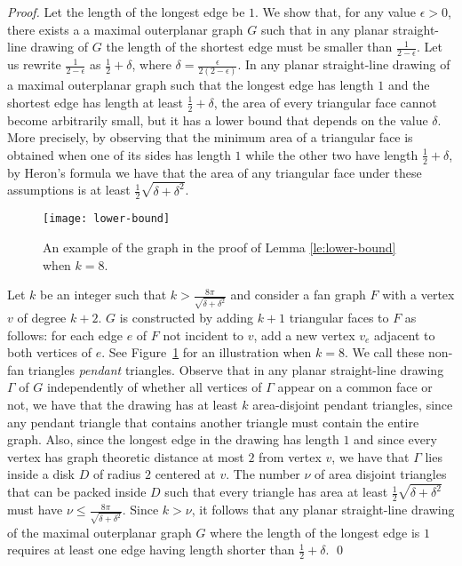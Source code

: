 \documentclass[orivec]{llncs}
\begin{document}
\begin{proof}
  Let the length of the longest edge be $1$. We show that, for any value $\epsilon > 0$, there exists a a maximal outerplanar graph $G$ such that in any planar straight-line drawing of $G$ the length of the shortest edge must be smaller than $\frac{1}{2-\epsilon}$. Let us rewrite  $\frac{1}{2-\epsilon}$ as $\frac{1}{2} + \delta$, where $\delta=\frac{\epsilon}{2(2-\epsilon)}$. In any planar straight-line drawing of a maximal outerplanar graph such that  the longest edge has length $1$ and the shortest edge has length at least $\frac{1}{2} + \delta$, the area of every triangular face cannot become arbitrarily small, but it has a lower bound that depends on the value $\delta$. More precisely, by observing that the minimum area of a triangular face is obtained when one of its sides has length $1$ while the other two have length $\frac{1}{2} + \delta$, by Heron's formula we have that the area of any triangular face under these assumptions is at least $\frac{1}{2} \sqrt{\delta + \delta^2}$.

\begin{figure}
\centering
\texttt{[image: lower-bound]}
\caption{\label{fi:lower-bound}An example of the graph in the proof of Lemma \ref{le:lower-bound} when $k =8$.}
\end{figure}

  Let $k$ be an integer such that $k > \frac{8 \pi}{\sqrt{\delta + \delta^2}}$ and consider a fan graph $F$ with a vertex $v$ of degree $k + 2$. $G$ is constructed by adding $k +1$ triangular faces to $F$ as follows: for each edge $e$ of $F$ not incident to $v$, add a new vertex $v_e$ adjacent
to both vertices of $e$. See Figure~\ref{fi:lower-bound} for an illustration when $k = 8$.
We call these non-fan triangles {\em pendant} triangles. Observe that in any planar straight-line drawing $\Gamma$ of $G$ independently of whether all vertices of $\Gamma$ appear on a common face or not, we have that the drawing has at least $k$ area-disjoint pendant triangles, since any pendant triangle that contains another triangle must contain the entire graph. Also, since the longest edge in the drawing has length $1$ and since every vertex has graph theoretic distance at most $2$ from vertex $v$, we have that $\Gamma$ lies inside a disk $D$ of radius $2$  centered at $v$. The number $\nu$ of area disjoint triangles that can be packed inside $D$ such that every triangle has area at least $\frac{1}{2} \sqrt{\delta + \delta^2}$ must have $\nu \leq \frac{8 \pi}{\sqrt{\delta + \delta^2}}$. Since $k > \nu$, it follows that any planar straight-line drawing of the maximal outerplanar graph $G$ where the length of the longest edge is $1$ requires at least one edge having length shorter than $\frac{1}{2} + \delta$. \qed
\end{proof}
\end{document}
